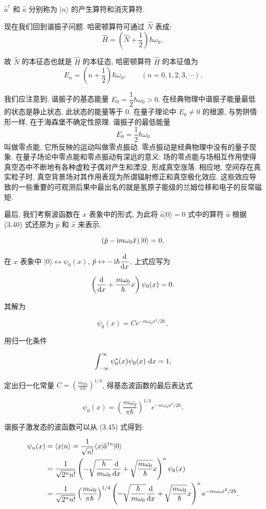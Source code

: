 $\hat{a}^{\dagger}$ 和 $\hat{a}$ 分别称为 $|n\rangle$ 的产生算符和消灭算符.

现在我们回到谐振子问题. 哈密顿算符可通过 $\hat{N}$ 表成:
\begin{equation}
\hat{H} = \left( \hat{N} + \dfrac{1}{2} \right)\hbar\omega_0,
\tag{3.46}
\end{equation}

故 $\hat{N}$ 的本征态也就是 $\hat{H}$ 的本征态, 哈密顿算符 $\hat{H}$ 的本征值为
\[
E_n = \left( n + \dfrac{1}{2} \right)\hbar\omega_0,
\qquad
(n=0, 1, 2, 3, \cdots).
\]

我们应注意到, 谐振子的基态能量 $E_0=\dfrac{1}{2}\hbar\omega_0>0$.
在经典物理中谐振子能量最低的状态是静止状态, 此状态的能量等于 $0$.
在量子理论中 $E_0\neq 0$ 的根源, 与势阱情形一样, 在于海森堡不确定性原理.
谐振子的最低能量
\[
E_0=\dfrac{1}{2}\hbar\omega_0
\]
叫做零点能, 它所反映的运动叫做零点振动. 零点振动是经典物理中没有的量子现象. 在量子场论中零点能和零点振动有深远的意义: 场的零点能与场相互作用使得真空态中不断地有各种虚粒子偶对产生和湮没, 形成真空涨落. 相应地, 空间存在真实粒子时, 真空背景场对其作用表现为所谓辐射修正和真空极化效应. 这些效应导致的一些重要的可观测后果中最出名的就是氢原子能级的兰姆位移和电子的反常磁矩.

最后, 我们考察波函数在 $x$ 表象中的形式, 为此将
$\hat{a}|0\rangle=0$ 式中的算符 $\hat{a}$ 根据 (3.40) 式还原为
$\hat{p}$ 和 $\hat{x}$ 来表示.

\[
\left( \hat{p} - \mathop{}\!\mathrm{i} m\omega_0 \hat{x} \right)|0\rangle = 0,
\]

在 $x$ 表象中 $|0\rangle \leftrightarrow \psi_0(x)$,
$\hat{p} \leftrightarrow -\mathop{}\!\mathrm{i}\hbar \dfrac{\mathop{}\!\mathrm{d}}{\mathop{}\!\mathrm{d} x}$, 上式应写为

\[
\left( \dfrac{\mathop{}\!\mathrm{d}}{\mathop{}\!\mathrm{d} x} + \frac{m\omega_0}{\hbar}x \right)\psi_0(x)=0.
\]

其解为

\[
\psi_0(x)=C e^{-m\omega_0 x^2/2\hbar},
\]

用归一化条件

\[
\int_{-\infty}^{\infty}\psi_0^*(x)\psi_0(x)\, \mathop{}\!\mathrm{d} x=1,
\]

定出归一化常量
$C=\left( \frac{m\omega_0}{\pi\hbar} \right)^{1/4}$,
得基态波函数的最后表达式

\[
\psi_0(x)
=
\left( \frac{m\omega_0}{\pi\hbar} \right)^{1/4}
e^{-m\omega_0 x^2/2\hbar}.
\]

谐振子激发态的波函数可以从 (3.45) 式得到:

\[
\begin{aligned}
\psi_n(x)
&= \langle x|n\rangle
= \dfrac{1}{\sqrt{n!}}\langle x|\hat{a}^{\dagger n}|0\rangle
\nonumber\\
&=
\dfrac{1}{\sqrt{2^n n!}}
\left(
-\sqrt{\dfrac{\hbar}{m\omega_0}}\dfrac{\mathop{}\!\mathrm{d}}{\mathop{}\!\mathrm{d} x}
+
\sqrt{\dfrac{m\omega_0}{\hbar}}x
\right)^n
\psi_0(x)
\nonumber\\
&=
\dfrac{1}{\sqrt{2^n n!}}
\left( \dfrac{m\omega_0}{\pi\hbar} \right)^{1/4}
\left(
-\sqrt{\dfrac{\hbar}{m\omega_0}}\dfrac{\mathop{}\!\mathrm{d}}{\mathop{}\!\mathrm{d} x}
+
\sqrt{\dfrac{m\omega_0}{\hbar}}x
\right)^n
e^{-m\omega_0 x^2/2\hbar}.
\end{aligned}
\]

